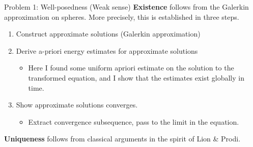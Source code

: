 \documentclass[xcolor=dvipsnames,leqno]{beamer}
\begin{document}
\begin{frame}{Problem 1: Well-posedness (Weak sense)}
\textbf{Existence} follows from the Galerkin approximation on spheres. More precisely, this is established in three steps.
	\begin{enumerate}
		\item Construct approximate solutions (Galerkin approximation)

		\item Derive a-priori energy estimates for approximate solutions
			\begin{itemize}
				\item Here I found some uniform apriori estimate on the solution to the transformed equation, and I show that the estimates exist globally in time.
			\end{itemize}
		\item Show approximate solutions converges.
			\begin{itemize}
				\item Extract convergence subsequence, pass to the limit in the equation.
			\end{itemize}
	\end{enumerate}
\textbf{Uniqueness} follows from classical arguments in the spirit of Lion \& Prodi.
\end{frame}  
\end{document}
